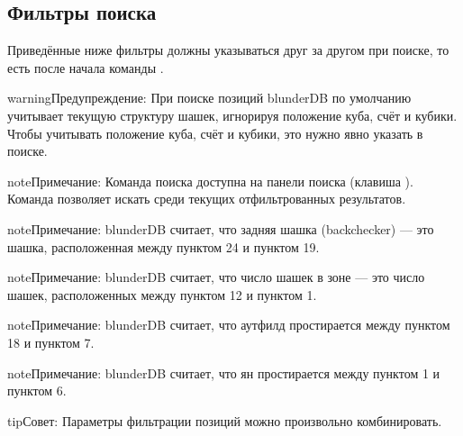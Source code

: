 \documentclass[letterpaper,10pt,russian]{sphinxmanual}
\begin{document}
\subsection{Фильтры поиска}
\label{\detokenize{cmd_mode:filtres-de-recherche}}\label{\detokenize{cmd_mode:cmd-filter}}
\sphinxAtStartPar
Приведённые ниже фильтры должны указываться друг за другом при поиске, то есть после начала команды .

\label{\detokenize{cmd_mode:cmd-filter-pos}}
\begin{sphinxadmonition}{warning}{Предупреждение:}
\sphinxAtStartPar
При поиске позиций blunderDB по умолчанию учитывает текущую структуру шашек, игнорируя положение куба, счёт и кубики. Чтобы учитывать положение куба, счёт и кубики, это нужно явно указать в поиске.
\end{sphinxadmonition}

\begin{sphinxadmonition}{note}{Примечание:}
\sphinxAtStartPar
Команда поиска  доступна на панели поиска (клавиша ). Команда  позволяет искать среди текущих отфильтрованных результатов.
\end{sphinxadmonition}

\begin{sphinxadmonition}{note}{Примечание:}
\sphinxAtStartPar
blunderDB считает, что задняя шашка (backchecker) — это шашка, расположенная между пунктом 24 и пунктом 19.
\end{sphinxadmonition}

\begin{sphinxadmonition}{note}{Примечание:}
\sphinxAtStartPar
blunderDB считает, что число шашек в зоне — это число шашек, расположенных между пунктом 12 и пунктом 1.
\end{sphinxadmonition}

\begin{sphinxadmonition}{note}{Примечание:}
\sphinxAtStartPar
blunderDB считает, что аутфилд простирается между пунктом 18 и пунктом 7.
\end{sphinxadmonition}

\begin{sphinxadmonition}{note}{Примечание:}
\sphinxAtStartPar
blunderDB считает, что ян простирается между пунктом 1 и пунктом 6.
\end{sphinxadmonition}

\begin{sphinxadmonition}{tip}{Совет:}
\sphinxAtStartPar
Параметры фильтрации позиций можно произвольно комбинировать.
\end{sphinxadmonition}
\end{document}
